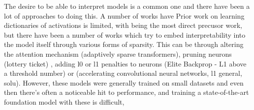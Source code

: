 The desire to be able to interpret models is a common one and there have been a lot of approaches to doing this. A number of works have 
Prior work on learning dictionaries of activations is limited, with  \citet{yun2023transformer} being the most direct precusor work, but there have been a number of works which try to embed interpretability into the model itself through various forms of sparsity. This can be through altering the attention mechanism (adaptively sparse transformers), pruning neurons (lottery ticket) , adding l0 or l1 penalties to neurons (Elite Backprop - L1 above a threshold number) or (accelerating convolutional neural networks, l1 general, solu).
However, these models were generally trained on small datasets and even then there's often a noticeable hit to performance, and training a state-of-the-art foundation model with these is difficult,
